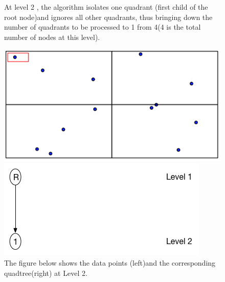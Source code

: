 \documentclass{article}
\begin{document}
\begin{figure}[H]
At level 2 , the algorithm isolates  one quadrant (first child of the root node)and ignores all other quadrants, thus bringing down the number of quadrants to be processed to 1 from 4(4 is the total number of nodes at this level).

  \centering
  \begin{minipage}[b]{0.35\textwidth}
    \includegraphics[width=\textwidth]{1_1Quad1_2}  
  \end{minipage}
  \hfill
  \begin{minipage}[b]{0.5\textwidth}
    \includegraphics[width=\textwidth]{1Quad_2_tree}
  \end{minipage}
  \caption{The figure below shows the data points (left)and the corresponding quadtree(right) at Level 2.}
\end{figure}

\vspace{2cm}
\end{document}
